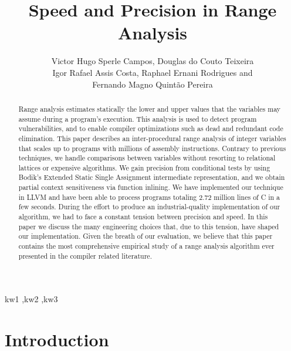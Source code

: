 \documentclass[preprint]{elsarticle}
\begin{document}
\begin{frontmatter}

\title{Speed and Precision in Range Analysis}

\author{Victor Hugo Sperle Campos, Douglas do Couto Teixeira \\
Igor Rafael Assis Costa, Raphael Ernani Rodrigues and\\
Fernando Magno Quint\~{a}o Pereira%
}

\address{UFMG -- 6627 Ant\^{o}nio Carlos Av, 31.270-010, Belo Horizonte, Brazil}

\begin{abstract}
Range analysis estimates statically the lower and upper values that
the variables may assume during a program's execution.
This analysis is used to detect program vulnerabilities, and to enable compiler
optimizations such as dead and redundant code elimination.
This paper describes an inter-procedural range analysis of integer variables
that scales up to programs with millions of assembly instructions.
Contrary to previous techniques, we handle comparisons between variables
without resorting to relational lattices or expensive algorithms.
We gain precision from conditional tests by using Bodik's Extended Static
Single Assignment intermediate representation, and we obtain partial
context sensitiveness via function inlining.
We have implemented our technique in LLVM and have been able to process
programs totaling 2.72 million lines of C in a few seconds.
During the effort to produce an industrial-quality implementation of our
algorithm, we had to face a constant tension between precision and speed.
In this paper we discuss the many engineering choices that, due to this tension,
have shaped our implementation.
Given the breath of our evaluation, we believe that this paper contains the most
comprehensive empirical study of a range analysis algorithm ever presented in
the compiler related literature.
\end{abstract}

\begin{keyword}
kw1 \sep kw2 \sep kw3
\end{keyword}

\end{frontmatter}

\section{Introduction}
\end{document}

